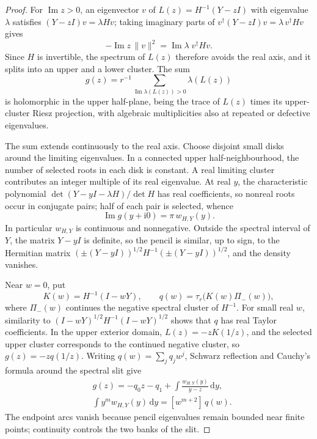 \documentclass[aps,prl,reprint,superscriptaddress,longbibliography,floatfix,raggedbottom]{revtex4-2}
\newcommand{\ii}{\mathrm i}
\newcommand{\dd}{\,\mathrm d}
\newcommand{\norm}[1]{\lVert #1\rVert}
\newcommand{\tr}{\tau}
\begin{document}
\begin{proof}
For $\operatorname{Im}z>0$, an eigenvector $v$ of $L(z)=H^{-1}(Y-zI)$
with eigenvalue $\lambda$ satisfies $(Y-zI)v=\lambda Hv$; taking
imaginary parts of $v^\dagger(Y-zI)v=\lambda\,v^\dagger Hv$ gives
\[
-\operatorname{Im}z\,\norm v^2
=\operatorname{Im}\lambda\;v^\dagger Hv .
\]
Since $H$ is invertible, the spectrum of $L(z)$ therefore avoids the
real axis, and it splits into an upper and a lower cluster. The sum
\[
g(z)=r^{-1}\sum_{\operatorname{Im}\lambda(L(z))>0}\lambda(L(z))
\]
is holomorphic in the upper half-plane, being the trace of $L(z)$ times
its upper-cluster Riesz projection, with algebraic multiplicities also
at repeated or defective eigenvalues.

The sum extends continuously to the real axis. Choose disjoint small
disks around the limiting eigenvalues. In a connected upper
half-neighbourhood, the number of selected roots in each disk is
constant. A real limiting cluster contributes an integer multiple of
its real eigenvalue. At real $y$, the characteristic polynomial
$\det(Y-yI-\lambda H)/\det H$ has real coefficients, so nonreal roots
occur in conjugate pairs; half of each pair is selected, whence
\[
\operatorname{Im}g(y+\ii0)=\pi\,w_{H,Y}(y).
\]
In particular $w_{H,Y}$ is continuous and nonnegative. Outside the
spectral interval of $Y$, the matrix $Y-yI$ is definite, so the pencil
is similar, up to sign, to the Hermitian matrix
$(\pm(Y-yI))^{1/2}H^{-1}(\pm(Y-yI))^{1/2}$, and the density vanishes.

Near $w=0$, put
\[
K(w)=H^{-1}(I-wY),\qquad q(w)=\tr_r\bigl(K(w)\Pi_-(w)\bigr),
\]
where $\Pi_-(w)$ continues the negative spectral cluster of $H^{-1}$.
For small real $w$, similarity to $(I-wY)^{1/2}H^{-1}(I-wY)^{1/2}$
shows that $q$ has real Taylor coefficients. In the upper exterior
domain, $L(z)=-zK(1/z)$, and the selected upper cluster corresponds to
the continued negative cluster, so $g(z)=-zq(1/z)$. Writing
$q(w)=\sum_jq_jw^j$, Schwarz reflection and Cauchy's formula around the
spectral slit give
\begin{align}\label{eq:Cauchydensity}
&g(z)=-q_0z-q_1+\int\frac{w_{H,Y}(y)}{y-z}\dd y, \nonumber \\
& \int y^mw_{H,Y}(y)\dd y=[w^{m+2}]\,q(w).
\end{align}
The endpoint arcs vanish because pencil eigenvalues remain bounded near
finite points; continuity controls the two banks of the slit.


\end{proof}
\end{document}
